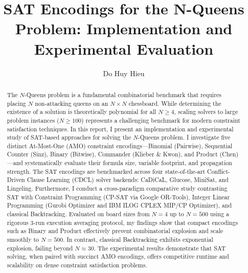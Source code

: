 \documentclass[a4paper,fleqn]{cas-sc}
\begin{document}
\let\WriteBookmarks\relax


\title [mode = title]{SAT Encodings for the N-Queens Problem: Implementation and Experimental Evaluation}

\author[1]{Do Huy Hieu}
\cormark[1]



\begin{abstract}
The $N$-Queens problem is a fundamental combinatorial benchmark that requires placing $N$ non-attacking queens on an $N \times N$ chessboard. While determining the existence of a solution is theoretically polynomial for all $N \ge 4$, scaling solvers to large problem instances ($N \ge 100$) represents a challenging benchmark for modern constraint satisfaction techniques. In this report, I present an implementation and experimental study of SAT-based approaches for solving the $N$-Queens problem. I investigate five distinct At-Most-One (AMO) constraint encodings---Binomial (Pairwise), Sequential Counter (Sinz), Binary (Bitwise), Commander (Klieber \& Kwon), and Product (Chen)---and systematically evaluate their formula size, variable footprint, and propagation strength. The SAT encodings are benchmarked across four state-of-the-art Conflict-Driven Clause Learning (CDCL) solver backends: CaDiCaL, Glucose, MiniSat, and Lingeling. Furthermore, I conduct a cross-paradigm comparative study contrasting SAT with Constraint Programming (CP-SAT via Google OR-Tools), Integer Linear Programming (Gurobi Optimizer and IBM ILOG CPLEX MIP/CP Optimizer), and classical Backtracking. Evaluated on board sizes from $N = 4$ up to $N = 500$ using a rigorous 3-run execution averaging protocol, my findings show that compact encodings such as Binary and Product effectively prevent combinatorial explosion and scale smoothly to $N = 500$. In contrast, classical Backtracking exhibits exponential explosion, failing beyond $N \approx 30$. The experimental results demonstrate that SAT solving, when paired with succinct AMO encodings, offers competitive runtime and scalability on dense constraint satisfaction problems.
\end{abstract}
\end{document}

